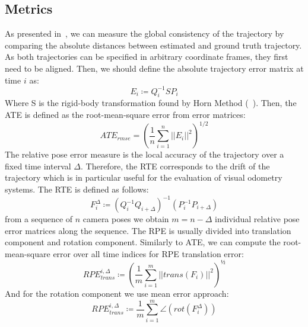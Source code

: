 \subsection{Metrics}\label{subsec:ate-and-rte}
As presented in~\cite{measuring_robustness_of_visual_slam}, we can measure the global consistency of the trajectory by comparing the absolute distances between estimated and ground truth trajectory.
As both trajectories can be specified in arbitrary coordinate frames, they first need to be aligned.
Then, we should define the absolute trajectory error matrix at time $i$ as:
\begin{equation}
    \label{eq:ate-error-matrix}
    E_i \coloneq Q_i^{-1} SP_i
\end{equation}
Where S is the rigid-body transformation found by Horn Method (~\cite{horn_method}).
Then, the ATE is defined as the root-mean-square error from error matrices:
\begin{equation}
    ATE_{rmse} = (\frac{1}{n} \sum_{i=1}^{n} ||E_i||^2)^{1/2}
    \label{eq:ate-rmse}
\end{equation}
The relative pose error measure is the local accuracy of the trajectory over a fixed time interval $\Delta$.
Therefore, the RTE corresponds to the drift of the trajectory which is in particular useful for the evaluation of visual odometry systems.
The RTE is defined as follows:
\begin{equation}
    F_i^{\Delta} \coloneq (Q_i^{-1} Q_{i+\Delta})^{-1} (P_i^{-1} P_{i+\Delta})
    \label{eq:rte}
\end{equation}
from a sequence of $n$ camera poses we obtain  $m = n - \Delta$ individual relative pose error matrices along the sequence.
The RPE is usually divided into translation component and rotation component.
Similarly to ATE, we can compute the root-mean-square error over all time indices for RPE translation error:
\begin{equation}
    RPE_{trans}^{i, \Delta} \coloneq (\frac{1}{m} \sum_{i=1}^m ||trans(F_i)||^2)^{½}
    \label{eq:rpe-trans}
\end{equation}
And for the rotation component we use mean error approach:
\begin{equation}
    RPE_{trans}^{i, \Delta} \coloneq \frac{1}{m} \sum_{i=1}^m \angle (rot(F_i^\Delta))
    \label{eq:equation-rpe-trans}
\end{equation}